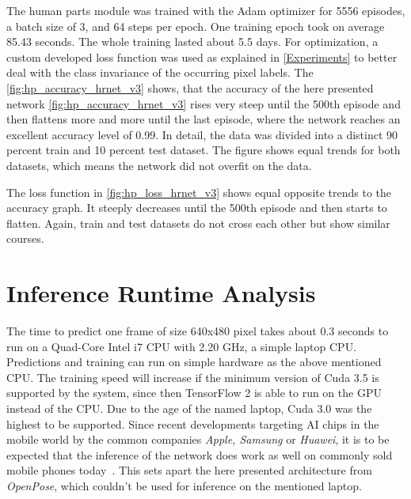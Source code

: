 The human parts module was trained with the Adam optimizer for 5556 episodes, a batch size of 3,
and 64 steps per epoch.
One training epoch took on average 85.43 seconds.
The whole training lasted about 5.5 days.
For optimization, a custom developed loss function was used as explained in
\autoref{Experiments} to better deal with the class invariance of the occurring pixel labels.
The \autoref{fig:hp_accuracy_hrnet_v3} shows, that the accuracy of the here presented network
\autoref{fig:hp_accuracy_hrnet_v3} rises very steep until the 500th episode and then flattens more and more until the last
episode, where the network reaches an excellent accuracy level of 0.99.
In detail, the data was divided into a distinct 90 percent train and 10 percent test dataset.
The figure shows equal trends for both datasets, which means the network did not overfit on the data.\

The loss function in \autoref{fig:hp_loss_hrnet_v3} shows equal opposite trends to the accuracy graph.
It steeply decreases until the 500th episode and then starts to flatten.
Again, train and test datasets do not cross each other but show similar courses.

\section{Inference Runtime Analysis}
The time to predict one frame of size 640x480 pixel takes about 0.3 seconds to run on a Quad-Core Intel i7 CPU with 2.20 GHz,
a simple laptop CPU.
Predictions and training can run on simple hardware as the above mentioned CPU.
The training speed will increase if the minimum version of Cuda
3.5 is supported by the system, since then TensorFlow 2 is able to run on the GPU instead of the CPU.
Due to the age of the named laptop, Cuda 3.0 was the highest to be supported.
Since recent developments targeting AI chips in the mobile world by the common companies \textit{Apple, Samsung} or \textit{Huawei},
it is to be expected that the inference of the network does work as well on commonly sold mobile phones today~\cite{mobileAI}.
This sets apart the here presented architecture from \textit{OpenPose}, which couldn't be used for inference on the mentioned laptop.

